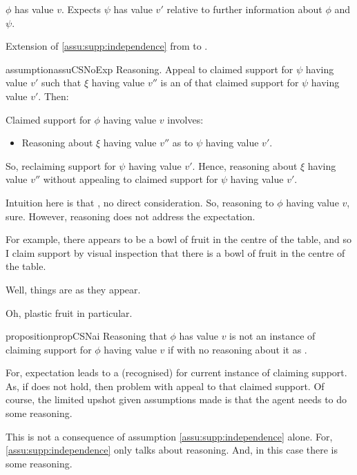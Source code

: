 \begin{note}
  \(\phi\) has value \(v\).
  Expects \(\psi\) has value \(v'\) relative to further information about \(\phi\) and \(\psi\).

  Extension of \autoref{assu:supp:independence} from  to .
\end{note}

\begin{note}
  \begin{restatable}{assumption}{assuCSNoExp}\label{assu:independence-expec}
    Reasoning.
    Appeal to claimed support for \(\psi\) having value \(v'\) such that \(\xi\) having value \(v''\) is an \expec{} of that claimed support for \(\psi\) having value \(v'\).
    Then:

    Claimed support for \(\phi\) having value \(v\) involves:
    \begin{itemize}
    \item Reasoning about \(\xi\) having value \(v''\) as \expec{} to \(\psi\) having value \(v'\).
    \end{itemize}
  \end{restatable}
  So, reclaiming support for \(\psi\) having value \(v'\).
  Hence, reasoning about \(\xi\) having value \(v''\) without appealing to claimed support for \(\psi\) having value \(v'\).
\end{note}

\begin{note}
  Intuition here is that \expec{}, no direct consideration.
  So, reasoning to \(\phi\) having value \(v\), sure.
  However, reasoning does not address the expectation.
\end{note}

\begin{note}
  For example, there appears to be a bowl of fruit in the centre of the table, and so I claim support by visual inspection that there is a bowl of fruit in the centre of the table.

  Well, things are as they appear.

  Oh, plastic fruit in particular.
\end{note}

\begin{note}
  \begin{restatable}{proposition}{propCSNai}\label{prop:CS-nai}
    Reasoning that \(\phi\) has value \(v\) is not an instance of claiming support for \(\phi\) having value \(v\) if \expec{} with no reasoning about it as \expec{}.
  \end{restatable}

  For, expectation leads to a (recognised) \requ{} for current instance of claiming support.
  As, if \expec{} does not hold, then problem with appeal to that claimed support.
  Of course, the limited upshot given assumptions made is that the agent needs to do some reasoning.

  {
    \color{red}
    This is not a consequence of assumption \autoref{assu:supp:independence} alone.
    For, \autoref{assu:supp:independence} only talks about reasoning.
    And, in this case there is some reasoning.
  }
\end{note}

